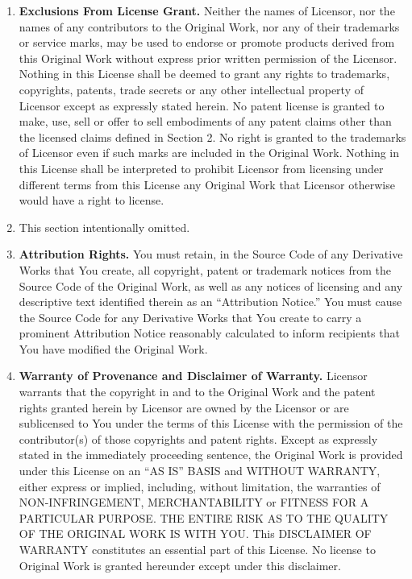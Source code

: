 \documentclass[letterpaper,10pt,titlepage]{custbook}
\begin{document}
\begin{it}
\begin{enumerate}
\item \textbf{Exclusions From License Grant.}  Neither the names of Licensor, nor the names of any 
      contributors to the Original Work, nor any of their trademarks or service marks, may 
	  be used to endorse or promote products derived from this Original Work without express prior 
	  written permission of the Licensor.  Nothing in this License shall be deemed to grant any 
	  rights to trademarks, copyrights, patents, trade secrets or any other intellectual property 
	  of Licensor except as expressly stated herein. No patent license is granted to make, use, 
	  sell or offer to sell embodiments of any patent claims other than the licensed claims 
	  defined in Section 2.  No right is granted to the trademarks of Licensor even if such marks 
	  are included in the Original Work. Nothing in this License shall be interpreted to prohibit 
	  Licensor from licensing under different terms from this License any Original Work that 
	  Licensor otherwise would have a right to license. 

\item This section intentionally omitted. 

\item \textbf{Attribution Rights.}  You must retain, in the Source Code of any Derivative Works that
      You create, all copyright, patent or trademark notices from the Source Code of the Original Work, 
	  as well as any notices of licensing and any descriptive text identified therein as an 
	  ``Attribution Notice.''  You must cause the Source Code for any Derivative Works that 
	  You create to carry a prominent Attribution Notice reasonably calculated to inform 
	  recipients that You have modified the Original Work. 

\item \textbf{Warranty of Provenance and Disclaimer of Warranty.}  Licensor warrants that the copyright in 
      and to the Original Work and the patent rights granted herein by Licensor are owned by the 
	  Licensor or are sublicensed to You under the terms of this License with the permission of 
	  the contributor(s) of those copyrights and patent rights.  Except as expressly stated in the 
	  immediately proceeding sentence, the Original Work is provided under this License on an 
	  ``AS IS'' BASIS and WITHOUT WARRANTY, either express or implied, including, without limitation, 
	  the warranties of NON-INFRINGEMENT, MERCHANTABILITY or FITNESS FOR A PARTICULAR PURPOSE. 
	  THE ENTIRE RISK AS TO THE QUALITY OF THE ORIGINAL WORK IS WITH YOU.  This DISCLAIMER OF WARRANTY 
	  constitutes an essential part of this License.  No license to Original Work is granted 
	  hereunder except under this disclaimer. 


\end{enumerate}
\end{it}
\end{document}
